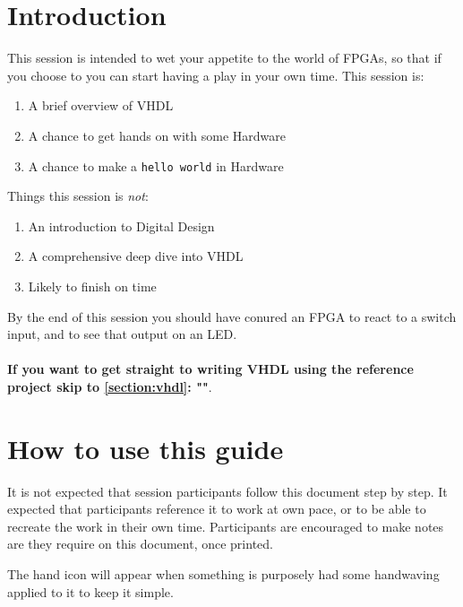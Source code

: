 \section{Introduction}
This session is intended to wet your appetite to the world of FPGAs, so that if you choose to you can start having a play in your own time. This session is:
\begin{enumerate}
    \item A brief overview of VHDL
    \item A chance to get hands on with some Hardware
    \item A chance to make a \texttt{hello world} in Hardware
\end{enumerate}

Things this session is \emph{not}:
\begin{enumerate}
    \item An introduction to Digital Design
    \item A comprehensive deep dive into VHDL
    \item Likely to finish on time
\end{enumerate}

By the end of this session you should have conured an FPGA to react to a switch input, and to see that output on an LED. \\ \\
\textbf{If you want to get straight to writing VHDL using the reference project skip to \cref{section:vhdl}: ""}. 

\section{How to use this guide}
It is not expected that session participants follow this document step by step. It expected that participants reference it to work at own pace, or to be able to recreate the work in their own time. Participants are encouraged to make notes are they require on this document, once printed. 

The hand \handwaving icon will appear when something is purposely had some handwaving applied to it to keep it simple.


